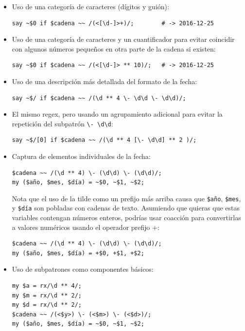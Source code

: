 \begin{itemize}

\item Uso de una categoría de caracteres (dígitos y guión):

\begin{lstlisting}
say ~$0 if $cadena ~~ /(<[\d-]>+)/;        # -> 2016-12-25
\end{lstlisting}
%

\item Uso de una categoría de caracteres y un cuantificador
para evitar coincidir con algunos números pequeños 
en otra parte de la cadena si existen:

\begin{lstlisting}
say ~$0 if $cadena ~~ /(<[\d-]> ** 10)/;   # -> 2016-12-25
\end{lstlisting}
%

\item Uso de una descripción más detallada del formato de la fecha:
\begin{lstlisting}
say ~$/ if $cadena ~~ /(\d ** 4 \- \d\d \- \d\d)/;
\end{lstlisting}
%

\item El mismo regex, pero usando un agrupamiento adicional 
para evitar la repetición del subpatrón \verb|\- \d\d|:

\begin{lstlisting}
say ~$/[0] if $cadena ~~ /(\d ** 4 [\- \d\d] ** 2 )/; 
\end{lstlisting}
%

\item Captura de elementos individuales de la fecha:
\begin{lstlisting}
$cadena ~~ /(\d ** 4) \- (\d\d) \- (\d\d)/;
my ($año, $mes, $día) = ~$0, ~$1, ~$2;
\end{lstlisting}
%
Nota que el uso de la tilde como un prefijo más arriba
causa que \verb|$año|, \verb|$mes|, y \verb|$día| son
pobladas con cadenas de texto. Asumiendo que quieras
que estas variables contengan números enteros, podrías 
usar coacción para convertirlas a valores numéricos usando el operador
prefijo +:
\begin{lstlisting}
$cadena ~~ /(\d ** 4) \- (\d\d) \- (\d\d)/;
my ($año, $mes, $día) = +$0, +$1, +$2;
\end{lstlisting}
%
 

\item Uso de subpatrones como componentes básicos:
\begin{lstlisting}
my $a = rx/\d ** 4/;
my $m = rx/\d ** 2/;
my $d = rx/\d ** 2/;
$cadena ~~ /(<$y>) \- (<$m>) \- (<$d>)/;
my ($año, $mes, $día) = ~$0, ~$1, ~$2;
\end{lstlisting}
%


\end{itemize}
